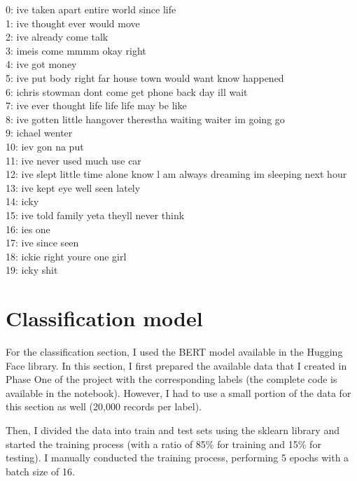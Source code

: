 \documentclass[a4paper]{article}
\begin{document}
\begin{center}
    0:  ive taken apart entire world since life\\
    1:  ive thought ever would move\\
    2:  ive already come talk\\
    3:  imeis come mmmm okay right\\
    4:  ive got money\\
    5:  ive put body right far house town would want know happened\\
    6:  ichris stowman dont come get phone back day ill wait\\
    7:  ive ever thought life life life may be like\\
    8:  ive gotten little hangover therestha waiting waiter im going go\\
    9:  ichael wenter\\
    10:  iev gon na put\\
    11:  ive never used much use car\\
    12:  ive slept little time alone know l am always dreaming im sleeping next hour\\
    13:  ive kept eye well seen lately\\
    14:  icky\\
    15:  ive told family yeta theyll never think\\
    16:  ies one\\
    17:  ive since seen\\
    18:  ickie right youre one girl\\
    19:  icky shit\\
\end{center}

\section{Classification model}

For the classification section, I used the BERT model available in the Hugging Face library. In this section, I first prepared the available data that I created in Phase One of the project with the corresponding labels (the complete code is available in the notebook). However, I had to use a small portion of the data for this section as well (20,000 records per label).

Then, I divided the data into train and test sets using the sklearn library and started the training process (with a ratio of 85\% for training and 15\% for testing). I manually conducted the training process, performing 5 epochs with a batch size of 16.
\end{document}
